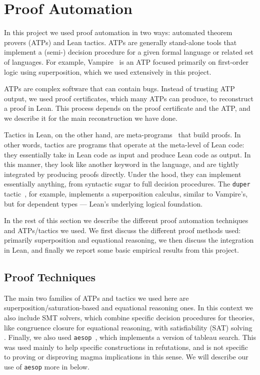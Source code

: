 \section{Proof Automation}\label{automated-sec}

In this project we used proof automation in two ways: automated theorem provers (ATPs) and Lean tactics.
ATPs are generally stand-alone tools that implement a (semi-) decision procedure for a given formal language or related set of languages.
For example, Vampire~\cite{DBLP:conf/cav/KovacsV13} is an ATP focused primarily on first-order logic using superposition, which we used extensively in this project.

ATPs are complex software that can contain bugs.
Instead of trusting ATP output, we used proof certificates, which many ATPs can produce, to reconstruct a proof in Lean.
This process depends on the proof certificate and the ATP, and we describe it for the main reconstruction we have done.

Tactics in Lean, on the other hand, are meta-programs~\cite{DBLP:journals/pacmpl/EbnerURAM17} that build proofs.
In other words, tactics are programs that operate at the meta-level of Lean code: they essentially take in Lean code as input and produce Lean code as output.
In this manner, they look like another keyword in the language, and are tightly integrated by producing proofs directly.
Under the hood, they can implement essentially anything, from syntactic sugar to full decision procedures.
The \texttt{duper} tactic~\cite{DBLP:conf/itp/CluneQBA24}, for example, implements a superposition calculus, similar to Vampire's, but for dependent types --- Lean's underlying logical foundation.

In the rest of this section we describe the different proof automation techniques and ATPs/tactics we used.
We first discuss the different proof methods used: primarily superposition and equational reasoning, we then discuss the integration in Lean, and finally we report some basic empirical results from this project.

\subsection{Proof Techniques}

The main two families of ATPs and tactics we used here are superposition/saturation-based and equational reasoning ones.
In this context we also include SMT solvers, which combine specific decision procedures for theories, like congruence closure for equational reasoning, with satisfiability (SAT) solving \cite{deMoura-Bjorner-2009}.
Finally, we also used \texttt{aesop}~\cite{DBLP:conf/cpp/LimpergF23}, which implements a version of tableau search.
This was used mainly to help specific constructions in refutations, and is not specific to proving or disproving magma implications in this sense.
We will describe our use of \texttt{aesop} more in  below.

